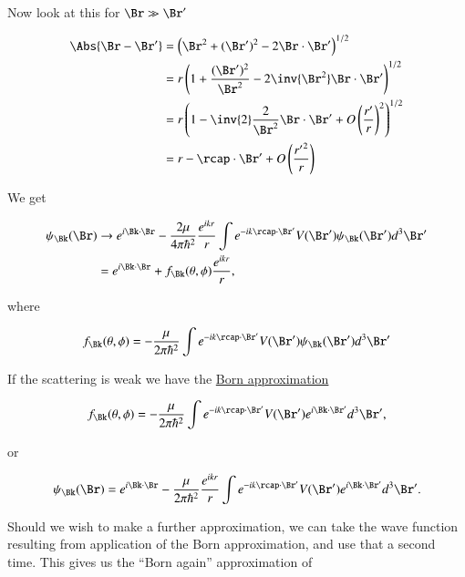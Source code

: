 Now look at this for $\Br \gg \Br'$

\begin{align*}
\Abs{\Br - \Br'} 
&= 
\left( 
\Br^2 + (\Br')^2 - 2 \Br \cdot \Br'
\right)^{1/2} \\
&=
r 
\left( 
1 + \frac{(\Br')^2}{\Br^2} - 2 \inv{\Br^2} \Br \cdot \Br'
\right)^{1/2} \\
&=
r 
\left( 
1 - \inv{2} \frac{2}{\Br^2} \Br \cdot \Br'
+ O\left(\frac{r'}{r}\right)^2
\right)^{1/2} \\
&=
r 
- \rcap \cdot \Br'
+ O\left(\frac{{r'}^2}{r}\right)
\end{align*}

We get 

\begin{equation}\label{eqn:qmTwoL25:210}
\begin{aligned}
\psi_\Bk(\Br) 
&\rightarrow e^{i \Bk \cdot \Br} - \frac{2 \mu}{4 \pi \hbar^2} \frac{ e^{i k r}}{r} \int e^{-i k \rcap \cdot \Br'} V(\Br') \psi_\Bk(\Br') d^3 \Br' \\
&=
e^{i \Bk \cdot \Br} + f_\Bk(\theta, \phi) \frac{ e^{i k r}}{r},
\end{aligned}
\end{equation}

where

\begin{equation}\label{eqn:qmTwoL25:230}
f_\Bk(\theta, \phi) =
- \frac{\mu}{2 \pi \hbar^2} \int e^{-i k \rcap \cdot \Br'} V(\Br') \psi_\Bk(\Br') d^3 \Br' 
\end{equation}

If the scattering is weak we have the \underline{Born approximation}

\begin{equation}\label{eqn:qmTwoL25:250}
f_\Bk(\theta, \phi) =
- \frac{\mu}{2 \pi \hbar^2} \int e^{-i k \rcap \cdot \Br'} V(\Br') e^{i \Bk \cdot \Br'} d^3 \Br',
\end{equation}

or

\begin{equation}\label{eqn:qmTwoL25:270}
\psi_\Bk(\Br) =
e^{i \Bk \cdot \Br} - \frac{\mu}{2 \pi \hbar^2} \frac{ e^{i k r}}{r} \int e^{-i k \rcap \cdot \Br'} V(\Br') e^{i \Bk \cdot \Br'} d^3 \Br'.
\end{equation}

Should we wish to make a further approximation, we can take the wave function resulting from application of the Born approximation, and use that a second time.  This gives us the ``Born again'' approximation of

